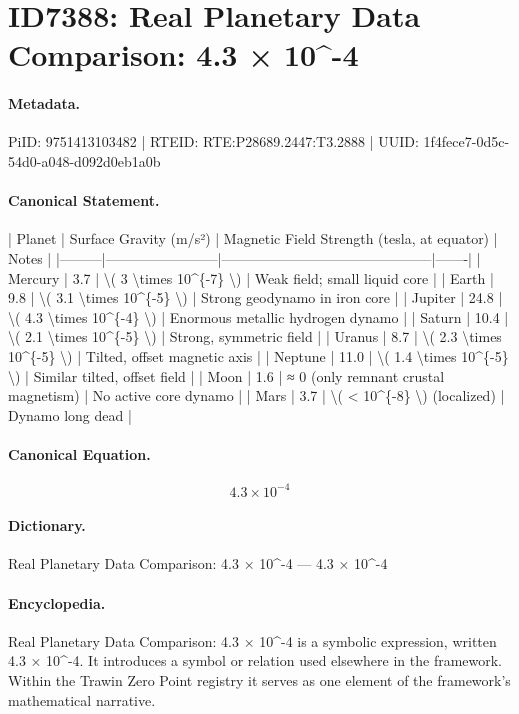 \section*{ID7388: Real Planetary Data Comparison: 4.3 × 10\textasciicircum{}-4}
\paragraph{Metadata.}
PiID: 9751413103482 | RTEID: RTE:P28689.2447:T3.2888 | UUID: 1f4fece7-0d5c-54d0-a048-d092d0eb1a0b

\paragraph{Canonical Statement.}
| Planet | Surface Gravity (m/s²) | Magnetic Field Strength (tesla, at equator) | Notes | |---------|------------------------|---------------------------------------------|-------| | Mercury | 3.7 | \textbackslash{}( 3 \textbackslash{}times 10\textasciicircum{}\{-7\} \textbackslash{}) | Weak field; small liquid core | | Earth | 9.8 | \textbackslash{}( 3.1 \textbackslash{}times 10\textasciicircum{}\{-5\} \textbackslash{}) | Strong geodynamo in iron core | | Jupiter | 24.8 | \textbackslash{}( 4.3 \textbackslash{}times 10\textasciicircum{}\{-4\} \textbackslash{}) | Enormous metallic hydrogen dynamo | | Saturn | 10.4 | \textbackslash{}( 2.1 \textbackslash{}times 10\textasciicircum{}\{-5\} \textbackslash{}) | Strong, symmetric field | | Uranus | 8.7 | \textbackslash{}( 2.3 \textbackslash{}times 10\textasciicircum{}\{-5\} \textbackslash{}) | Tilted, offset magnetic axis | | Neptune | 11.0 | \textbackslash{}( 1.4 \textbackslash{}times 10\textasciicircum{}\{-5\} \textbackslash{}) | Similar tilted, offset field | | Moon | 1.6 | ≈ 0 (only remnant crustal magnetism) | No active core dynamo | | Mars | 3.7 | \textbackslash{}( < 10\textasciicircum{}\{-8\} \textbackslash{}) (localized) | Dynamo long dead |

\paragraph{Canonical Equation.}
\[
4.3 \times 10^{-4}
\]

\paragraph{Dictionary.}
Real Planetary Data Comparison: 4.3 × 10\textasciicircum{}-4 — 4.3 × 10\textasciicircum{}-4

\paragraph{Encyclopedia.}
Real Planetary Data Comparison: 4.3 × 10\textasciicircum{}-4 is a symbolic expression, written 4.3 × 10\textasciicircum{}-4. It introduces a symbol or relation used elsewhere in the framework. Within the Trawin Zero Point registry it serves as one element of the framework's mathematical narrative.
